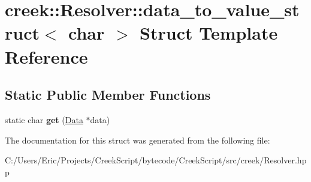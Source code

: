 \hypertarget{structcreek_1_1_resolver_1_1data__to__value__struct_3_01char_01_4}{}\section{creek\+:\+:Resolver\+:\+:data\+\_\+to\+\_\+value\+\_\+struct$<$ char $>$ Struct Template Reference}
\label{structcreek_1_1_resolver_1_1data__to__value__struct_3_01char_01_4}
\subsection*{Static Public Member Functions}
\begin{DoxyCompactItemize}
\item 
static char {\bfseries get} (\hyperlink{classcreek_1_1_data}{Data} $\ast$data)\hypertarget{structcreek_1_1_resolver_1_1data__to__value__struct_3_01char_01_4_af982929ba079f77d0383fb9e8ace4a45}{}\label{structcreek_1_1_resolver_1_1data__to__value__struct_3_01char_01_4_af982929ba079f77d0383fb9e8ace4a45}

\end{DoxyCompactItemize}


The documentation for this struct was generated from the following file\+:\begin{DoxyCompactItemize}
\item 
C\+:/\+Users/\+Eric/\+Projects/\+Creek\+Script/bytecode/\+Creek\+Script/src/creek/Resolver.\+hpp\end{DoxyCompactItemize}
